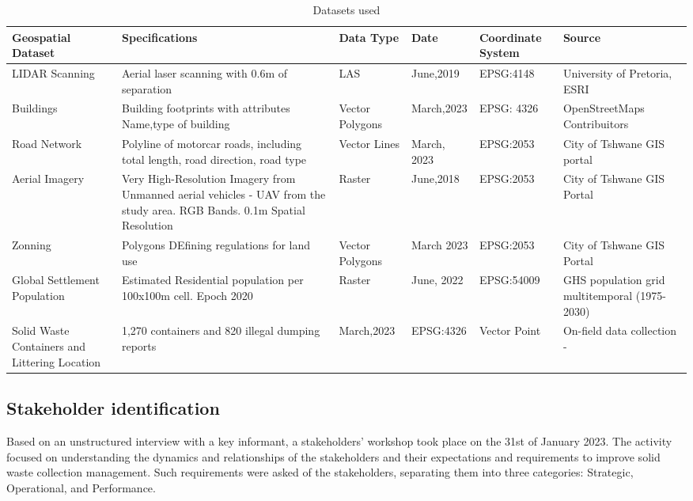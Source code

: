 \documentclass[authoryear,preprint,review,12pt]{elsarticle}
\begin{document}
    \begin{table}
        \centering
        \caption{Datasets used}
        \scriptsize
        \label{tab:Datasets}
        \begin{tabularx}{\linewidth}{X X X X X X}
            
            \toprule
            Geospatial Dataset & Specifications & Data Type & Date & Coordinate System & Source \\
            \midrule
            LIDAR Scanning & Aerial laser scanning with 0.6m of separation & LAS & June,2019&EPSG:4148&University of Pretoria, ESRI \\
            Buildings&Building footprints with attributes Name,type of building&Vector Polygons& March,2023&EPSG: 4326&OpenStreetMaps Contribuitors\\
            Road Network&Polyline of motorcar roads, including total length, road direction, road type&Vector Lines&March, 2023&EPSG:2053&City of Tshwane GIS portal\\
            Aerial Imagery&Very High-Resolution Imagery from Unmanned aerial vehicles - UAV from the study area. RGB Bands. 0.1m Spatial Resolution&Raster&June,2018&EPSG:2053&City of Tshwane GIS Portal\\
            Zonning&Polygons DEfining regulations for land use&Vector Polygons&March 2023&EPSG:2053&City of Tshwane GIS Portal\\
            Global Settlement Population&Estimated Residential population per 100x100m cell. Epoch 2020&Raster&June, 2022&EPSG:54009&GHS population grid multitemporal (1975-2030) \citep{Schiavina2022}\\
            Solid Waste Containers and Littering Location&1,270 containers and 820 illegal dumping reports &March,2023&EPSG:4326&Vector Point& On-field data collection - \citep{cardenasivanSolidWasteVirtualWorld2024}\\
            \bottomrule
        \end{tabularx}
    \end{table}

    \subsection{Stakeholder identification} \label{subsec:stakeholderIdent}
    Based on an unstructured interview with a key informant, a stakeholders’ workshop took place on the 31st of January 2023. The activity focused on understanding the dynamics and relationships of the stakeholders and their expectations and requirements to improve solid waste collection management. Such requirements were asked of the stakeholders, separating them into three categories: Strategic, Operational, and Performance.
\end{document}
